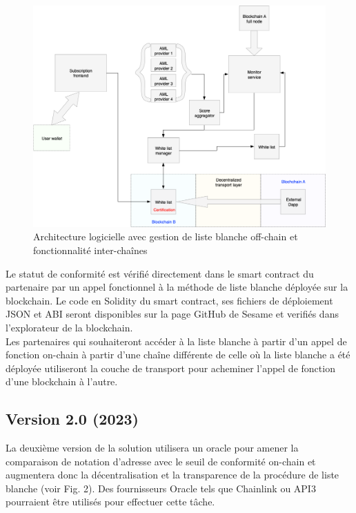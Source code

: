 ﻿\documentclass[a4paper]{article}
\begin{document}
\begin{figure}[!h]
\centering
\includegraphics[scale=0.35]{architecture_v1_crosschain_trim.png}
\caption{Architecture logicielle avec gestion de liste blanche off-chain et fonctionnalité inter-chaînes}
\label{offchain}
\end{figure}  

Le statut de conformité est vérifié directement dans le smart contract du partenaire par un appel fonctionnel à la méthode de liste blanche déployée sur la blockchain. Le code en Solidity du smart contract, ses fichiers de déploiement JSON et ABI seront disponibles sur la page GitHub de Sesame et verifi\'es dans l'explorateur de la blockchain. \\

Les partenaires qui souhaiteront accéder à la liste blanche à partir d'un appel de fonction on-chain à partir d'une chaîne différente de celle où la liste blanche a été déployée utiliseront la couche de transport pour acheminer l'appel de fonction d'une blockchain à l'autre.

\subsection{Version 2.0 (2023)}
La deuxième version de la solution utilisera un oracle pour amener la comparaison de notation d'adresse avec le seuil de conformité on-chain et augmentera donc la décentralisation et la transparence de la procédure de liste blanche (voir Fig. 2). Des fournisseurs Oracle tels que Chainlink ou API3 pourraient être utilisés pour effectuer cette tâche. \\
\end{document}
